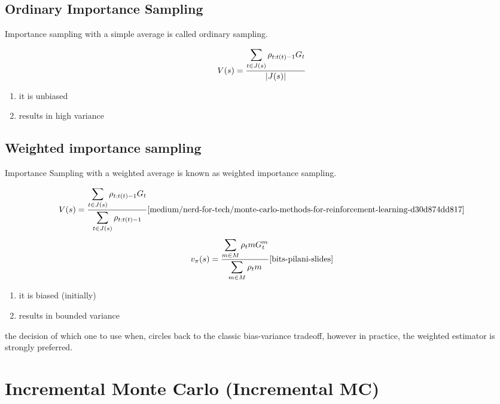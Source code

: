 \subsection{Ordinary Importance Sampling \cite{medium/nerd-for-tech/monte-carlo-methods-for-reinforcement-learning-d30d874dd817}}\label{RL: Ordinary Importance Sampling}

Importance sampling with a simple average is called ordinary sampling.

\[
    V(s) = \displaystyle\dfrac{\displaystyle\sum_{t\in J(s)} \rho_{t:t(t)-1}G_t}{|J(s)|}
\]

\begin{enumerate}
    \item it is unbiased
    \item results in high variance
\end{enumerate}

\subsection{Weighted importance sampling \cite{medium/nerd-for-tech/monte-carlo-methods-for-reinforcement-learning-d30d874dd817}}\label{RL: Weighted importance sampling}

Importance Sampling with a weighted average is known as weighted importance sampling.

\[
    V(s) = \displaystyle\dfrac{\dsum_{t\in J(s)} \rho_{t:t(t)-1}G_t}{\dsum_{t\in J(s)} \rho_{t:t(t)-1}} \hfill \text{\cite{medium/nerd-for-tech/monte-carlo-methods-for-reinforcement-learning-d30d874dd817}}
\]
\[
    v_\pi(s) = \displaystyle\dfrac{\dsum_{m\in M} \rho_t m G_t^m}{\dsum_{m\in M} \rho_t m} \hfill \text{\cite{bits-pilani-slides}}
\]

\begin{enumerate}
    \item it is biased (initially)
    \item results in bounded variance
\end{enumerate}

the decision of which one to use when, circles back to the classic bias-variance tradeoff, however in practice, the 
weighted estimator is strongly preferred.

\section{Incremental Monte Carlo (Incremental MC) \cite{redirect.cs.umbc.edu/courses/graduate/678/fall21/RL05}} \label{RL: Incremental Monte Carlo (Incremental MC)}

